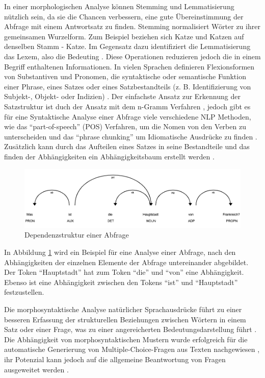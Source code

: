 \documentclass[
        ngerman,
        paper=a4,
        numbers=noendperiod,
]{scrreprt}
\begin{document}
In einer morphologischen Analyse können Stemming und Lemmatisierung nützlich sein, da sie die Chancen verbessern, eine gute Übereinstimmung der Abfrage mit einem Antwortsatz zu finden. Stemming normalisiert Wörter zu ihrer gemeinsamen Wurzelform. Zum Beispiel beziehen sich Katze und Katzen auf denselben Stamm - Katze. Im Gegensatz dazu identifiziert die Lemmatisierung das Lexem, also die Bedeuting \citep[S. 5419]{Kolomiyets2011APerspective}. Diese Operationen reduzieren jedoch die in einem Begriff enthaltenen Informationen. In vielen Sprachen definieren Flexionsformen von Substantiven und Pronomen, die syntaktische oder semantische Funktion einer Phrase, eines Satzes oder eines Satzbestandteils (z. B. Identifizierung von Subjekt-, Objekt- oder Indizien) \citep{nivre2006maltparser}. Der einfachste Ansatz zur Erkennung der Satzstruktur ist duch der Ansatz mit dem n-Gramm Verfahren \citep{brill2002analysis}, jedoch gibt es für eine Syntaktische Analyse einer Abfrage viele verschiedene NLP Methoden, wie das \enquote{part-of-speech} (POS) Verfahren, um die Nomen von den Verben zu unterscheiden und das \enquote{phrase chunking} um Idiomatische Ausdrücke zu finden \citep[S. 5419]{Kolomiyets2011APerspective}. Zusätzlich kann durch das Aufteilen eines Satzes in seine Bestandteile und das finden der Abhängigkeiten ein Abhängigkeitsbaum erstellt werden \citep{cui2005question}.  

\begin{figure}[H]
\centering\includegraphics[width=0.9\linewidth]{images/dep.png}
\caption[Dependenzstruktur einer Frage]{Dependenzstruktur einer Abfrage}
\label{fig:dep}
\end{figure}

In Abbildung \ref{fig:dep} wird ein Beispiel für eine Analyse einer Abfrage, nach den Abhängigkeiten der einzelnen Elemente der Abfrage untereinander abgebildet. Der Token \enquote{Hauptstadt} hat zum Token \enquote{die} und \enquote{von} eine Abhängigkeit. Ebenso ist eine Abhängigkeit zwischen den Tokens \enquote{ist} und \enquote{Hauptstadt} festzustellen.

Die morphosyntaktische Analyse natürlicher Sprachausdrücke führt zu einer besseren Erfassung der strukturellen Beziehungen zwischen
Wörtern in einem Satz oder einer Frage, was zu einer angereicherten Bedeutungsdarstellung führt \citep[S. 5420]{Kolomiyets2011APerspective}. Die Abhängigkeit von morphosyntaktischen Mustern wurde erfolgreich für die automatische Generierung von Multiple-Choice-Fragen aus Texten nachgewiesen \citep{mitkov2006computer}, ihr Potenzial kann jedoch auf die allgemeine Beantwortung von Fragen ausgeweitet werden \citep[S. 5420]{Kolomiyets2011APerspective}.
\end{document}
